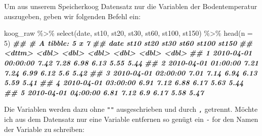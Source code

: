 \documentclass[
]{article}
\newenvironment{Shaded}{\begin{snugshade}}{\end{snugshade}}
\newcommand{\AttributeTok}[1]{\textcolor[rgb]{0.77,0.63,0.00}{#1}}
\newcommand{\DecValTok}[1]{\textcolor[rgb]{0.00,0.00,0.81}{#1}}
\newcommand{\DocumentationTok}[1]{\textcolor[rgb]{0.56,0.35,0.01}{\textbf{\textit{#1}}}}
\newcommand{\FunctionTok}[1]{\textcolor[rgb]{0.00,0.00,0.00}{#1}}
\newcommand{\NormalTok}[1]{#1}
\newcommand{\SpecialCharTok}[1]{\textcolor[rgb]{0.00,0.00,0.00}{#1}}
\begin{document}
Um aus unserem Speicherkoog Datensatz nur die Variablen der Bodentemperatur auszugeben, geben wir folgenden Befehl ein:

\begin{Shaded}
\begin{Highlighting}[]
\NormalTok{koog\_raw }\SpecialCharTok{\%\textgreater{}\%}
  \FunctionTok{select}\NormalTok{(date, st10, st20, st30, st60, st100, st150) }\SpecialCharTok{\%\textgreater{}\%}
  \FunctionTok{head}\NormalTok{(}\AttributeTok{n =} \DecValTok{5}\NormalTok{)}
\DocumentationTok{\#\# \# A tibble: 5 x 7}
\DocumentationTok{\#\#   date                 st10  st20  st30  st60 st100 st150}
\DocumentationTok{\#\#   \textless{}dttm\textgreater{}              \textless{}dbl\textgreater{} \textless{}dbl\textgreater{} \textless{}dbl\textgreater{} \textless{}dbl\textgreater{} \textless{}dbl\textgreater{} \textless{}dbl\textgreater{}}
\DocumentationTok{\#\# 1 2010{-}04{-}01 00:00:00  7.42  7.28  6.98  6.13  5.55  5.44}
\DocumentationTok{\#\# 2 2010{-}04{-}01 01:00:00  7.21  7.24  6.99  6.12  5.6   5.42}
\DocumentationTok{\#\# 3 2010{-}04{-}01 02:00:00  7.01  7.14  6.94  6.13  5.59  5.41}
\DocumentationTok{\#\# 4 2010{-}04{-}01 03:00:00  6.91  7.12  6.88  6.17  5.63  5.44}
\DocumentationTok{\#\# 5 2010{-}04{-}01 04:00:00  6.81  7.12  6.9   6.17  5.58  5.47}
\end{Highlighting}
\end{Shaded}

Die Variablen werden dazu ohne \texttt{""} ausgeschrieben und durch \texttt{,} getrennt. Möchte ich aus dem Datensatz nur eine Variable entfernen so genügt ein \texttt{-} for den Namen der Variable zu schreiben:
\end{document}
